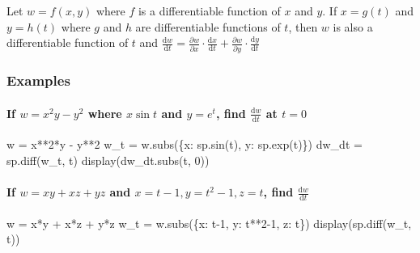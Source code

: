 \documentclass[
  letterpaper,
  DIV=11,
  numbers=noendperiod]{scrartcl}
\let\oldparagraph\paragraph
\renewcommand{\paragraph}[1]{\oldparagraph{#1}\mbox{}}
\newenvironment{Shaded}{\begin{snugshade}}{\end{snugshade}}
\newcommand{\NormalTok}[1]{\textcolor[rgb]{0.00,0.23,0.31}{#1}}
\begin{document}
Let \(w = f(x, y)\) where \(f\) is a differentiable function of \(x\)
and \(y\). If \(x = g(t)\) and \(y = h(t)\) where \(g\) and \(h\) are
differentiable functions of \(t\), then \(w\) is also a differentiable
function of \(t\) and
\(\frac{\mathrm{d}w}{\mathrm{d}t} = \frac{\partial w}{\partial x}\cdot \frac{\mathrm{d}x}{\mathrm{d}t} + \frac{\partial w}{\partial y}\cdot \frac{\mathrm{d}y}{\mathrm{d}t}\)

\subsubsection{Examples}\label{examples-8}

\paragraph{\texorpdfstring{If \(w=  x^2y-y^2\) where \(x\sin t\) and
\(y=e^t\), find \(\frac{\mathrm{d}w}{\mathrm{d}t}\) at
\(t=0\)}{If w=  x\^{}2y-y\^{}2 where x\textbackslash sin t and y=e\^{}t, find \textbackslash frac\{\textbackslash mathrm\{d\}w\}\{\textbackslash mathrm\{d\}t\} at t=0}}\label{if-w-x2y-y2-where-xsin-t-and-yet-find-fracmathrmdwmathrmdt-at-t0}

\begin{Shaded}
\begin{Highlighting}[numbers=left,,]
\NormalTok{w = x**2*y {-} y**2}
\NormalTok{w\_t = w.subs(\{x: sp.sin(t), y: sp.exp(t)\})}
\NormalTok{dw\_dt = sp.diff(w\_t, t)}
\NormalTok{display(dw\_dt.subs(t, 0))}
\end{Highlighting}
\end{Shaded}

\paragraph{\texorpdfstring{If \(w = xy + xz + yz\) and
\(x = t-1, y=t^2-1, z=t\), find
\(\frac{\mathrm{d}w}{\mathrm{d}t}\)}{If w = xy + xz + yz and x = t-1, y=t\^{}2-1, z=t, find \textbackslash frac\{\textbackslash mathrm\{d\}w\}\{\textbackslash mathrm\{d\}t\}}}\label{if-w-xy-xz-yz-and-x-t-1-yt2-1-zt-find-fracmathrmdwmathrmdt}

\begin{Shaded}
\begin{Highlighting}[numbers=left,,]
\NormalTok{w = x*y + x*z + y*z}
\NormalTok{w\_t = w.subs(\{x: t{-}1, y: t**2{-}1, z: t\})}
\NormalTok{display(sp.diff(w\_t, t))}
\end{Highlighting}
\end{Shaded}
\end{document}
